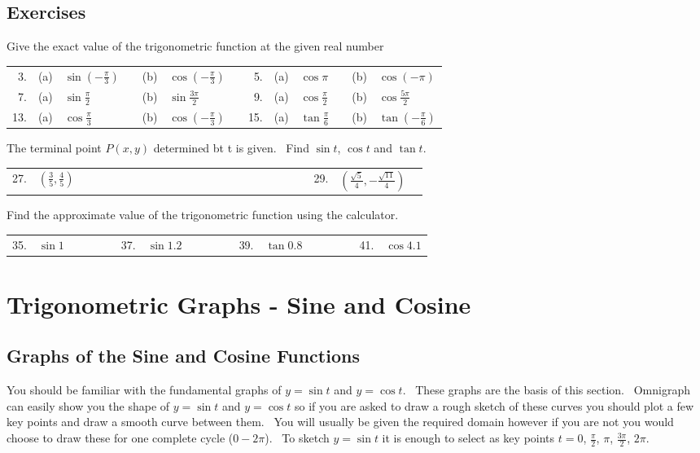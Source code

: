 \subsection{Exercises}
Give the exact value of the trigonometric function
at the given real number 


\begin{tabular}[c]{rllllllrlllll}3.\vspace*{0.25cm}
& (a)  & $\sin  \left ( -\frac{\pi }{3}\right )$  &  & (b)  & $\cos  \left ( -\frac{\pi }{3}\right )$  &  & 5.  & (a)
& $\cos  \pi $  &  & (b)  & $\cos  \left ( -\pi \right )$  \\
7.\vspace*{0.25cm}  & (a)
& $\sin  \frac{\pi }{2}$  &  & (b)  & $\sin  \frac{3 \pi }{2}$  &  & 9.  & (a)
& $\cos  \frac{\pi }{2}$  &  & (b)  & $\cos  \frac{5 \pi }{2}$  \\
13.\vspace*{0.25cm}  & (a)
& $\cos  \frac{\pi }{3}$  &  & (b)  & $\cos  \left ( -\frac{\pi }{3}\right )$  &  & 15.  & (a)
& $\tan  \frac{\pi }{6}$  &  & (b)  & $\tan  \left ( -\frac{\pi }{6}\right )$
\end{tabular}

The terminal point $P (x ,y)$ determined bt t is given. \ Find $\sin  t$, $\cos  t$ and $\tan  t\text{.}$ 


\begin{tabular}[c]{lllllllllll}27.  & $\left (\frac{3}{5} ,\frac{4}{5}\right )$  & \ \ \ \ \ \ \ \ \ \ \ \ \ \ \ \ \ \ \ \ \ \ \ \ \ \ \ \  &  &  &  &  &  & 29.
& $\left (\frac{\sqrt{5}}{4} , -\frac{\sqrt{11}}{4}\right )$  & 
\end{tabular}

Find the approximate value of the trigonometric function using the calculator. 

\begin{tabular}[c]{lllllllllll}35.  & $\sin  1$  & \ \ \ \ \ \  & 37.
& $\sin  1.2$  & \ \ \ \ \ \  & 39.
& $\tan  0.8$  & \ \ \ \ \ \  & 41.
& $\cos  4.1$
\end{tabular}



\section{Trigonometric Graphs - Sine and Cosine}

\subsection{Graphs of the Sine and Cosine Functions}
You should be familiar with the fundamental graphs of $y =\sin  t$ and $y =\cos  t$. \ These graphs are the basis of this section. \ Omnigraph
can easily show you the shape of $y =\sin  t$ and $y =\cos  t$ so if you are asked to draw a rough sketch of these curves you should plot a few key points and draw a smooth curve between them. \ You
will usually be given the required domain however if you are not you would choose to draw these for one complete cycle ($0 -2 \pi $). \ To sketch $y =\sin  t$ it is enough to select as key points $t =0$, $\frac{\pi }{2}$, $\pi $, $\frac{3 \pi }{2}$, $2 \pi $. 


